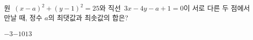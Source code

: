 원~$(x-a)^2+(y-1)^2=25$와 직선~$3x-4y-a+1=0$이 서로 다른 두 점에서 만날 때, 정수 $a$의 최댓값과 최솟값의 합은?
\begin{choices32}{$-3$}{$-1$}{$0$}{$1$}{$3$}\end{choices32}

